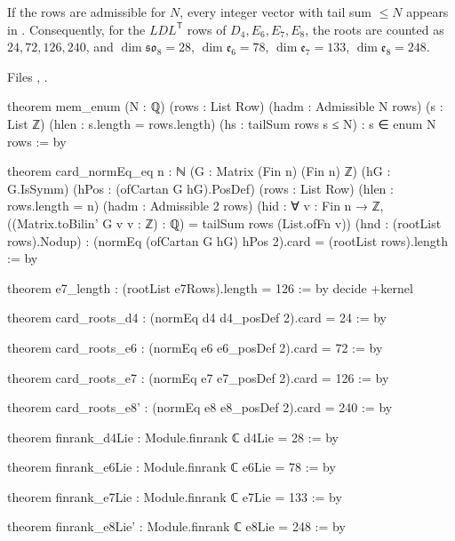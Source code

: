 \begin{theorem}\label{l23:thm:rootcounts}
If the rows are admissible for $N$, every integer vector with tail sum $\le N$ appears in . Consequently, for the
$LDL^{\mathsf T}$ rows of $D_4,E_6,E_7,E_8$, the roots are counted as $24,72,126,240$, and $\dim\mathfrak{so}_8=28$, $\dim\mathfrak e_6=78$,
$\dim\mathfrak e_7=133$, $\dim\mathfrak e_8=248$.
\end{theorem}
\noindent Files ,
.
\begin{leancode}
theorem mem_enum (N : ℚ) (rows : List Row) (hadm : Admissible N rows) (s : List ℤ)
    (hlen : s.length = rows.length) (hs : tailSum rows s ≤ N) : s ∈ enum N rows := by

theorem card_normEq_eq {n : ℕ} (G : Matrix (Fin n) (Fin n) ℤ) (hG : G.IsSymm)
    (hPos : (ofCartan G hG).PosDef) (rows : List Row) (hlen : rows.length = n)
    (hadm : Admissible 2 rows)
    (hid : ∀ v : Fin n → ℤ, ((Matrix.toBilin' G v v : ℤ) : ℚ) = tailSum rows (List.ofFn v))
    (hnd : (rootList rows).Nodup) :
    (normEq (ofCartan G hG) hPos 2).card = (rootList rows).length := by

theorem e7_length : (rootList e7Rows).length = 126 := by decide +kernel

theorem card_roots_d4 : (normEq d4 d4_posDef 2).card = 24 := by

theorem card_roots_e6 : (normEq e6 e6_posDef 2).card = 72 := by

theorem card_roots_e7 : (normEq e7 e7_posDef 2).card = 126 := by

theorem card_roots_e8' : (normEq e8 e8_posDef 2).card = 240 := by

theorem finrank_d4Lie : Module.finrank ℂ d4Lie = 28 := by

theorem finrank_e6Lie : Module.finrank ℂ e6Lie = 78 := by

theorem finrank_e7Lie : Module.finrank ℂ e7Lie = 133 := by

theorem finrank_e8Lie' : Module.finrank ℂ e8Lie = 248 := by
\end{leancode}

